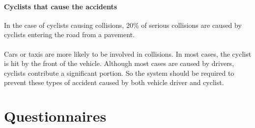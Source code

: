 \documentclass[a4paper]{report}
\begin{document}
{\paragraph{Cyclists that cause the accidents}In the case of cyclists causing collisions, 20\% of serious collisions are caused by cyclists entering the road from a pavement.
 
\paragraph{} Cars or taxis are more likely to be involved in collisions. In most cases, the cyclist is hit by the front of the vehicle. Although most cases are caused by drivers, cyclists contribute a significant portion. So the system should be required to prevent these types of accident caused by both vehicle driver and cyclist.


\newpage
\section{Questionnaires}
}
\end{document}
